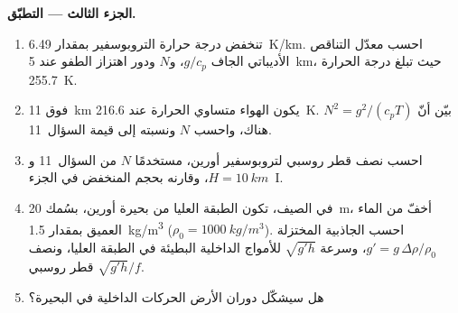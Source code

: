 \begin{problem}
\medskip\noindent\textbf{الجزء الثالث --- التطبّق.}
\begin{enumerate}[resume]
\item تنخفض درجة حرارة التروبوسفير بمقدار \qty{6.49}{K/km}.
  احسب معدّل التناقص الأديباتي الجاف $g/c_p$، و$N$ ودور
  اهتزاز الطفو عند \qty{5}{km}، حيث تبلغ درجة الحرارة
  \qty{255.7}{K}.
\item فوق \qty{11}{km} يكون الهواء متساوي الحرارة عند \qty{216.6}{K}. بيّن أنّ
  $N^2 = g^2/(c_pT)$ هناك، واحسب $N$ ونسبته إلى
  قيمة السؤال~11.
\item احسب نصف قطر روسبي لتروبوسفير أورين، مستخدمًا $N$ من
  السؤال~11 و$H = \qty{10}{km}$، وقارنه بحجم المنخفض في
  الجزء~I.
\item في الصيف، تكون الطبقة العليا من بحيرة أورين، بسُمك \qty{20}{m}، أخفّ من
  الماء العميق بمقدار \qty{1.5}{kg/m^3} ($\rho_0 = \qty{1000}{kg/m^3}$). احسب
  الجاذبية المختزلة $g' = g\,\Delta\rho/\rho_0$، وسرعة $\sqrt{g'h}$ للأمواج
  الداخلية البطيئة في الطبقة العليا، ونصف قطر روسبي
  $\sqrt{g'h}/f$.
\item هل سيشكّل دوران الأرض الحركات الداخلية في البحيرة؟
\end{enumerate}


\end{problem}
